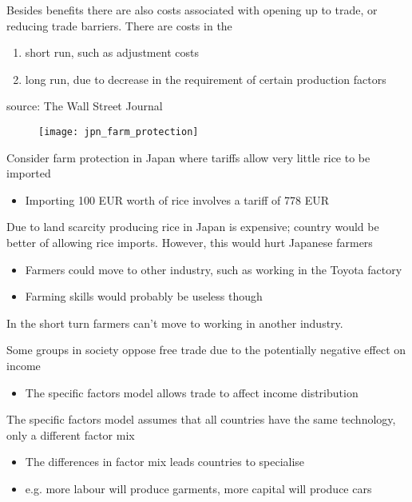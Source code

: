 \documentclass{beamer}
\begin{document}
\begin{frame}
  Besides benefits there are also costs associated with opening up to trade, or reducing trade barriers.
  There are costs in the 
  \medskip  
  \begin{enumerate}
    \item short run, such as adjustment costs
    \item long run, due to decrease in the requirement of certain production factors
  \end{enumerate}
\end{frame}

\begin{frame}{source: The Wall Street Journal}
  \begin{figure}
    \texttt{[image: jpn\_farm\_protection]}
  \end{figure}
\end{frame}

\begin{frame}
  Consider farm protection in Japan where tariffs allow very little rice to be imported
  \begin{itemize}
    \item Importing 100 EUR worth of rice involves a tariff of 778 EUR 
  \end{itemize}
  \medskip
  Due to land scarcity producing rice in Japan is expensive; country would be better of allowing rice imports.
  However, this would hurt Japanese farmers
  \begin{itemize}
    \item Farmers could move to other industry, such as working in the Toyota factory
    \item Farming skills would probably be useless though    
  \end{itemize}  
  \medskip
  In the short turn farmers can't move to working in another industry.
\end{frame}

\begin{frame}
  Some groups in society oppose free trade due to the potentially negative effect on income
  \begin{itemize}
    \item The specific factors model allows trade to affect income distribution
  \end{itemize}
  \medskip
  The specific factors model assumes that all countries have the same technology, only a different factor mix
  \begin{itemize}
    \item The differences in factor mix leads countries to specialise
    \item e.g. more labour will produce garments, more capital will produce cars
  \end{itemize}
\end{frame}
\end{document}
